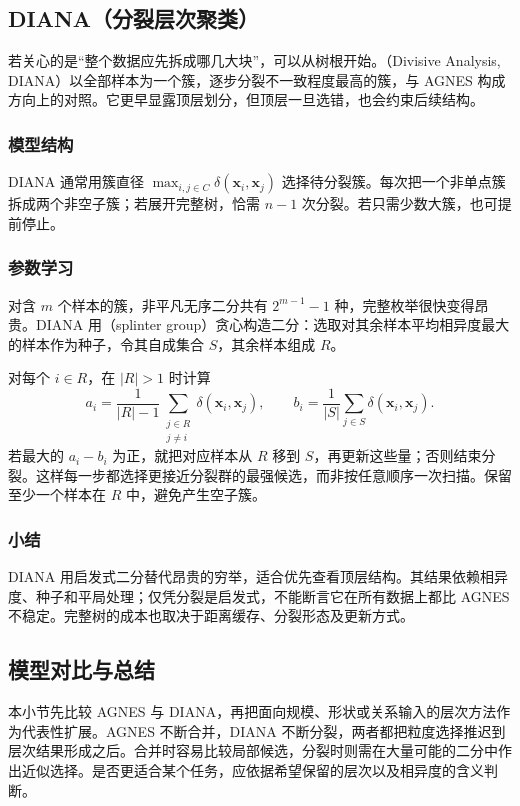 \subsection{DIANA（分裂层次聚类）}

若关心的是“整个数据应先拆成哪几大块”，可以从树根开始。（Divisive Analysis, DIANA）以全部样本为一个簇，逐步分裂不一致程度最高的簇，与 AGNES 构成方向上的对照。它更早显露顶层划分，但顶层一旦选错，也会约束后续结构。

\subsubsection{模型结构}

DIANA 通常用簇直径 $\max_{i,j\in C}\delta(\bm{x}_i,\bm{x}_j)$ 选择待分裂簇。每次把一个非单点簇拆成两个非空子簇；若展开完整树，恰需 $n-1$ 次分裂。若只需少数大簇，也可提前停止。

\subsubsection{参数学习}

对含 $m$ 个样本的簇，非平凡无序二分共有 $2^{m-1}-1$ 种，完整枚举很快变得昂贵。DIANA 用（splinter group）贪心构造二分：选取对其余样本平均相异度最大的样本作为种子，令其自成集合 $S$，其余样本组成 $R$。

对每个 $i\in R$，在 $|R|>1$ 时计算
\[
 a_i=\frac{1}{|R|-1}\sum_{\substack{j\in R\\j\ne i}}
 \delta(\bm{x}_i,\bm{x}_j),\qquad
 b_i=\frac{1}{|S|}\sum_{j\in S}\delta(\bm{x}_i,\bm{x}_j).
\]
若最大的 $a_i-b_i$ 为正，就把对应样本从 $R$ 移到 $S$，再更新这些量；否则结束分裂。这样每一步都选择更接近分裂群的最强候选，而非按任意顺序一次扫描。保留至少一个样本在 $R$ 中，避免产生空子簇。

\subsubsection{小结}

DIANA 用启发式二分替代昂贵的穷举，适合优先查看顶层结构。其结果依赖相异度、种子和平局处理；仅凭分裂是启发式，不能断言它在所有数据上都比 AGNES 不稳定。完整树的成本也取决于距离缓存、分裂形态及更新方式。

\subsection{模型对比与总结}

本小节先比较 AGNES 与 DIANA，再把面向规模、形状或关系输入的层次方法作为代表性扩展。AGNES 不断合并，DIANA 不断分裂，两者都把粒度选择推迟到层次结果形成之后。合并时容易比较局部候选，分裂时则需在大量可能的二分中作出近似选择。是否更适合某个任务，应依据希望保留的层次以及相异度的含义判断。

